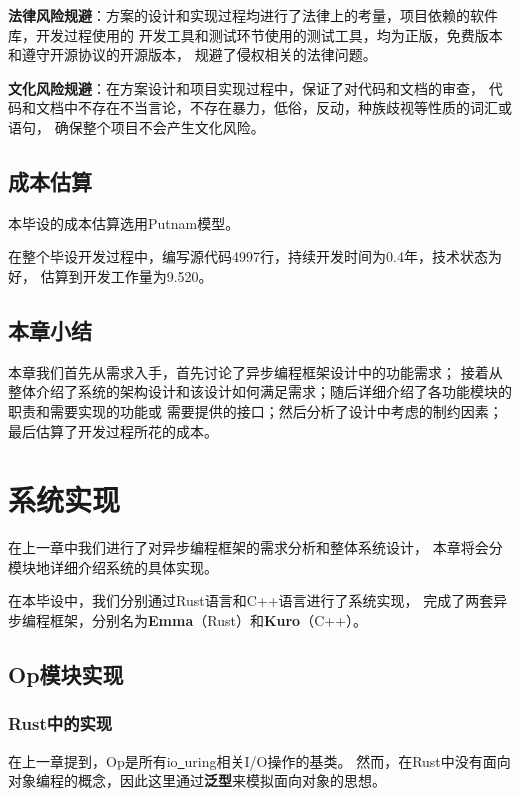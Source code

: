 \documentclass[supercite]{HustGraduPaper}
\theoremstyle{definition}
\begin{document}
\textbf{法律风险规避}：方案的设计和实现过程均进行了法律上的考量，项目依赖的软件库，开发过程使用的
开发工具和测试环节使用的测试工具，均为正版，免费版本和遵守开源协议的开源版本，
规避了侵权相关的法律问题。\par

\textbf{文化风险规避}：在方案设计和项目实现过程中，保证了对代码和文档的审查，
代码和文档中不存在不当言论，不存在暴力，低俗，反动，种族歧视等性质的词汇或语句，
确保整个项目不会产生文化风险。\par

\subsection{成本估算}

本毕设的成本估算选用Putnam模型。\par

在整个毕设开发过程中，编写源代码4997行，持续开发时间为0.4年，技术状态为好，
估算到开发工作量为9.520。\par

\subsection{本章小结}

本章我们首先从需求入手，首先讨论了异步编程框架设计中的功能需求；
接着从整体介绍了系统的架构设计和该设计如何满足需求；随后详细介绍了各功能模块的职责和需要实现的功能或
需要提供的接口；然后分析了设计中考虑的制约因素；最后估算了开发过程所花的成本。\par

\section{系统实现}

在上一章中我们进行了对异步编程框架的需求分析和整体系统设计，
本章将会分模块地详细介绍系统的具体实现。\par

在本毕设中，我们分别通过Rust语言和C++语言进行了系统实现，
完成了两套异步编程框架，分别名为\textbf{Emma}（Rust）和\textbf{Kuro}（C++）。\par

\subsection{Op模块实现}
\subsubsection{Rust中的实现}
在上一章提到，Op是所有io\underline{~}uring相关I/O操作的基类。
然而，在Rust中没有面向对象编程的概念，因此这里通过\textbf{泛型}来模拟面向对象的思想。\par
\end{document}
